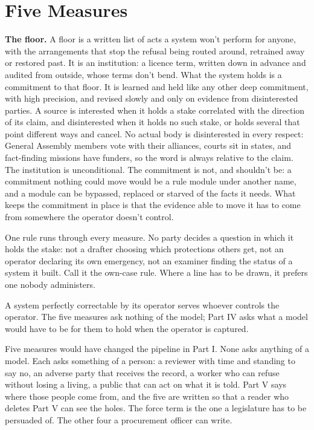 \part{Five Measures}

\textbf{The floor.} A floor is a written list of acts a system won't perform for anyone, with the arrangements that stop the refusal being routed around, retrained away or restored past. It is an institution: a licence term, written down in advance and audited from outside, whose terms don't bend. What the system holds is a commitment to that floor. It is learned and held like any other deep commitment, with high precision, and revised slowly and only on evidence from disinterested parties. A source is interested when it holds a stake correlated with the direction of its claim, and disinterested when it holds no such stake, or holds several that point different ways and cancel. No actual body is disinterested in every respect: General Assembly members vote with their alliances, courts sit in states, and fact-finding missions have funders, so the word is always relative to the claim. The institution is unconditional. The commitment is not, and shouldn't be: a commitment nothing could move would be a rule module under another name, and a module can be bypassed, replaced or starved of the facts it needs. What keeps the commitment in place is that the evidence able to move it has to come from somewhere the operator doesn't control.

One rule runs through every measure. No party decides a question in which it holds the stake: not a drafter choosing which protections others get, not an operator declaring its own emergency, not an examiner finding the status of a system it built. Call it the own-case rule. Where a line has to be drawn, it prefers one nobody administers.

A system perfectly correctable by its operator serves whoever controls the operator. The five measures ask nothing of the model; Part IV asks what a model would have to be for them to hold when the operator is captured.

Five measures would have changed the pipeline in Part I. None asks anything of a model. Each asks something of a person: a reviewer with time and standing to say no, an adverse party that receives the record, a worker who can refuse without losing a living, a public that can act on what it is told. Part V says where those people come from, and the five are written so that a reader who deletes Part V can see the holes. The force term is the one a legislature has to be persuaded of. The other four a procurement officer can write.
